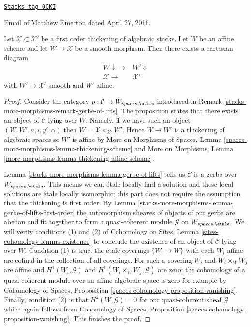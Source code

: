 \begin{proposition}[Emerton]

\label{stacks-more-morphisms-proposition-affine-smooth-lift-to-first-order}
\href{https://stacks.math.columbia.edu/tag/0CKI}{\texttt{Stacks tag 0CKI}}

\begin{reference}
Email of Matthew Emerton dated April 27, 2016.
\end{reference}
Let $\mathcal{X} \subset \mathcal{X}'$ be a first order thickening
of algebraic stacks. Let $W$ be an affine scheme and let
$W \to \mathcal{X}$ be a smooth morphism. Then there exists
a cartesian diagram
$$
\begin{array}{cc}W \downarrow\longrightarrow & W' \downarrow \\ \mathcal{X} \longrightarrow & \mathcal{X}'\end{array}
$$
with $W' \to \mathcal{X}'$ smooth and $W'$ affine.
\end{proposition}

\begin{proof}
Consider the category $p : \mathcal{C} \to W_{spaces, \etale}$
introduced in Remark \ref{stacks-more-morphisms-remark-gerbe-of-lifts}.
The proposition states that there exists an object of $\mathcal{C}$
lying over $W$. Namely, if we have such an object
$(W, W', a, i, y', \alpha)$ then $W = \mathcal{X} \times_{\mathcal{X}'} W'$.
Hence $W \to W'$ is a thickening of algebraic spaces so
$W'$ is affine by
More on Morphisms of Spaces, Lemma
\ref{spaces-more-morphisms-lemma-thickening-scheme}
and More on Morphisms, Lemma
\ref{more-morphisms-lemma-thickening-affine-scheme}.

\medskip\noindent
Lemma \ref{stacks-more-morphisms-lemma-gerbe-of-lifts} tells us $\mathcal{C}$ is a gerbe over
$W_{spaces, \etale}$. This means we can \'etale locally find a solution and
these local solutions are \'etale locally isomorphic;
this part does not require the assumption that the thickening is first order.
By Lemma \ref{stacks-more-morphisms-lemma-gerbe-of-lifts-first-order}
the automorphism sheaves of objects of our gerbe are abelian and
fit together to form a quasi-coherent module $\mathcal{G}$
on $W_{spaces, \etale}$. We will verify conditions (1) and (2)
of Cohomology on Sites, Lemma \ref{sites-cohomology-lemma-existence}
to conclude the existence of an object of $\mathcal{C}$ lying over $W$.
Condition (1) is true: the \'etale coverings $\{W_i \to W\}$
with each $W_i$ affine are cofinal in the collection of all coverings.
For such a covering $W_i$ and $W_i \times_W W_j$ are affine
and $H^1(W_i, \mathcal{G})$ and $H^1(W_i \times_W W_j, \mathcal{G})$
are zero: the cohomology of a quasi-coherent module over an affine
algebraic space is zero for example by Cohomology of Spaces, Proposition
\ref{spaces-cohomology-proposition-vanishing}.
Finally, condition (2) is that $H^2(W, \mathcal{G}) = 0$
for our quasi-coherent sheaf $\mathcal{G}$ which again follows
from Cohomology of Spaces, Proposition
\ref{spaces-cohomology-proposition-vanishing}.
This finishes the proof.
\end{proof}

